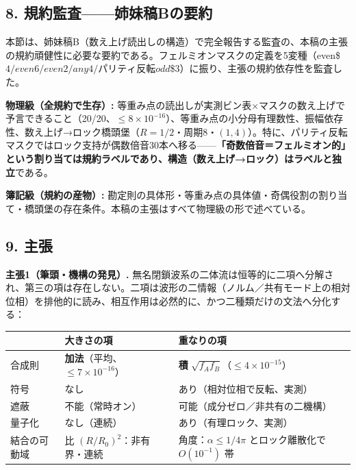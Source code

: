 \documentclass[
  a4paper,
]{ltjsarticle}
\newcounter{none} %
\begin{document}
\subsection{8.
規約監査------姉妹稿Bの要約}\label{ux898fux7d04ux76e3ux67fbux59c9ux59b9ux7a3fbux306eux8981ux7d04}

本節は、姉妹稿B（数え上げ読出しの構造）で完全報告する監査の、本稿の主張の規約頑健性に必要な要約である。フェルミオンマスクの定義を5変種（even\$\ge\(4 / even\)\ge\(6 / even\)\ge\(2 / any\)\ge\(4 / パリティ反転 odd\)\ge\$3）に振り、主張の規約依存性を監査した。

\textbf{物理級（全規約で生存）:}
等重み点の読出しが実測ビン表×マスクの数え上げで予言できること（20/20、\(\le8\times10^{-16}\)）、等重み点の小分母有理数性、振幅依存性、数え上げ→ロック橋頭堡（\(R=1/2\)・周期8・\((1,4)\)）。特に、パリティ反転マスクではロック支持が偶数倍音30本へ移る------\textbf{「奇数倍音＝フェルミオン的」という割り当ては規約ラベルであり、構造（数え上げ→ロック）はラベルと独立}である。

\textbf{簿記級（規約の産物）:}
勘定則の具体形・等重み点の具体値・奇偶役割の割り当て・橋頭堡の存在条件。本稿の主張はすべて物理級の形で述べている。

\subsection{9. 主張}\label{ux4e3bux5f35}

\textbf{主張1（筆頭・機構の発見）.}
無名閉鎖波系の二体流は恒等的に二項へ分解され、第三の項は存在しない。二項は波形の二情報（ノルム／共有モード上の相対位相）を排他的に読み、相互作用は必然的に、かつ二種類だけの文法へ分化する：

{\def\LTcaptype{none} %
\begin{longtable}[]{@{}
  >{\raggedright\arraybackslash}p{}
  >{\raggedright\arraybackslash}p{}
  >{\raggedright\arraybackslash}p{}@{}}
\toprule\noalign{}
\begin{minipage}[b]{\linewidth}\raggedright
\end{minipage} & \begin{minipage}[b]{\linewidth}\raggedright
大きさの項
\end{minipage} & \begin{minipage}[b]{\linewidth}\raggedright
重なりの項
\end{minipage} \\
\midrule\noalign{}
\endhead
\bottomrule\noalign{}
\endlastfoot
合成則 & \textbf{加法}（平均、\(\le7\times10^{-16}\)） & \textbf{積}
\(\sqrt{f_Af_B}\)（\(\le4\times10^{-15}\)） \\
符号 & なし & あり（相対位相で反転、実測） \\
遮蔽 & 不能（常時オン） & 可能（成分ゼロ／非共有の二機構） \\
量子化 & なし（連続） & あり（有理ロック、実測） \\
結合の可動域 & 比 \((R/R_0)^2\)：非有界・連続 &
角度：\(\alpha\le1/4\pi\) とロック離散化で \(O(10^{-1})\) 帯 \\
\end{longtable}
}
\end{document}

